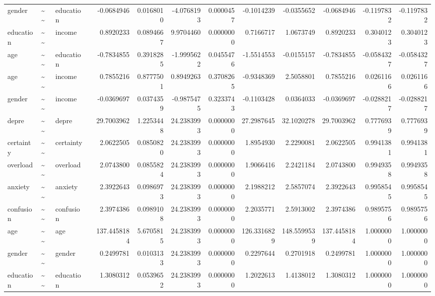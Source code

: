 \documentclass[
]{article}
\begin{document}
\begin{table}[!h]
\begin{tabular}[t]{llllrrrrrrrrr}
\addlinespace
gender & \textasciitilde{}\textasciitilde{} & education &  & -0.0684946 & 0.0168010 & -4.0768193 & 0.0000457 & -0.1014239 & -0.0355652 & -0.0684946 & -0.1197832 & -0.1197832\\
education & \textasciitilde{}\textasciitilde{} & income &  & 0.8920233 & 0.0894667 & 9.9704460 & 0.0000000 & 0.7166717 & 1.0673749 & 0.8920233 & 0.3040123 & 0.3040123\\
age & \textasciitilde{}\textasciitilde{} & education &  & -0.7834855 & 0.3918285 & -1.9995622 & 0.0455476 & -1.5514553 & -0.0155157 & -0.7834855 & -0.0584327 & -0.0584327\\
age & \textasciitilde{}\textasciitilde{} & income &  & 0.7855216 & 0.8777501 & 0.8949263 & 0.3708265 & -0.9348369 & 2.5058801 & 0.7855216 & 0.0261166 & 0.0261166\\
gender & \textasciitilde{}\textasciitilde{} & income &  & -0.0369697 & 0.0374359 & -0.9875475 & 0.3233743 & -0.1103428 & 0.0364033 & -0.0369697 & -0.0288217 & -0.0288217\\
\addlinespace
depre & \textasciitilde{}\textasciitilde{} & depre &  & 29.7003962 & 1.2253448 & 24.2383993 & 0.0000000 & 27.2987645 & 32.1020278 & 29.7003962 & 0.7776939 & 0.7776939\\
certainty & \textasciitilde{}\textasciitilde{} & certainty &  & 2.0622505 & 0.0850820 & 24.2383993 & 0.0000000 & 1.8954930 & 2.2290081 & 2.0622505 & 0.9941381 & 0.9941381\\
overload & \textasciitilde{}\textasciitilde{} & overload &  & 2.0743800 & 0.0855824 & 24.2383993 & 0.0000000 & 1.9066416 & 2.2421184 & 2.0743800 & 0.9949358 & 0.9949358\\
anxiety & \textasciitilde{}\textasciitilde{} & anxiety &  & 2.3922643 & 0.0986973 & 24.2383993 & 0.0000000 & 2.1988212 & 2.5857074 & 2.3922643 & 0.9958545 & 0.9958545\\
confusion & \textasciitilde{}\textasciitilde{} & confusion &  & 2.3974386 & 0.0989108 & 24.2383993 & 0.0000000 & 2.2035771 & 2.5913002 & 2.3974386 & 0.9895756 & 0.9895756\\
\addlinespace
age & \textasciitilde{}\textasciitilde{} & age &  & 137.4458184 & 5.6705815 & 24.2383993 & 0.0000000 & 126.3316829 & 148.5599539 & 137.4458184 & 1.0000000 & 1.0000000\\
gender & \textasciitilde{}\textasciitilde{} & gender &  & 0.2499781 & 0.0103133 & 24.2383993 & 0.0000000 & 0.2297644 & 0.2701918 & 0.2499781 & 1.0000000 & 1.0000000\\
education & \textasciitilde{}\textasciitilde{} & education &  & 1.3080312 & 0.0539652 & 24.2383993 & 0.0000000 & 1.2022613 & 1.4138012 & 1.3080312 & 1.0000000 & 1.0000000\\

\end{tabular}
\end{table}
\end{document}
